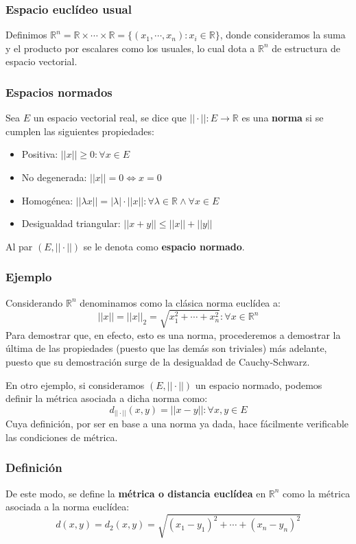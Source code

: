 \documentclass[10pt,a4paper,openright]{book}
\theoremstyle{break}
\begin{document}
\subsubsection*{Espacio euclídeo usual}
Definimos $\mathbb R ^n = \mathbb R\times \cdots \times \mathbb R = \{(x_1, \cdots, x_n): x_i\in \mathbb R\}$, donde consideramos la suma y el producto por escalares como los usuales, lo cual dota a $\mathbb R^n$ de estructura de espacio vectorial.

\subsubsection*{Espacios normados}
Sea $E$ un espacio vectorial real, se dice que $||\cdot||: E \rightarrow \mathbb R$ es una \textbf{norma} si se cumplen las siguientes propiedades:
\begin{itemize}
\item Positiva: $||x||\geq 0: \forall x \in E$
\item No degenerada: $||x|| = 0 \Leftrightarrow x = 0$
\item Homogénea: $||\lambda x|| = |\lambda| \cdot ||x||: \forall \lambda \in \mathbb R \wedge \forall x \in E$
\item Desigualdad triangular: $||x+y||\leq ||x|| + ||y||$
\end{itemize}
Al par $(E,||\cdot||)$ se le denota como \textbf{espacio normado}.

\subsubsection*{Ejemplo}
Considerando $\mathbb R^n$ denominamos como la clásica norma euclídea a:
$$||x|| = ||x||_2 = \sqrt{x_1^2+\cdots + x_n^2} : \forall x \in \mathbb R^n $$
Para demostrar que, en efecto, esto es una norma, procederemos a demostrar la última de las propiedades (puesto que las demás son triviales) más adelante, puesto que su demostración surge de la desigualdad de Cauchy-Schwarz.

En otro ejemplo, si consideramos $\left(E,||\cdot||\right)$ un espacio normado, podemos definir la métrica asociada a dicha norma como:
$$d_{||\cdot||}(x,y)=||x-y||: \forall x, y \in E$$
Cuya definición, por ser en base a una norma ya dada, hace fácilmente verificable las condiciones de métrica.

\subsubsection*{Definición}
De este modo, se define la \textbf{métrica o distancia euclídea} en $\mathbb R^n$ como la métrica asociada a la norma euclídea:
$$d(x,y)=d_2(x,y)=\sqrt{(x_1-y_1)^2+\cdots + (x_n-y_n)^2}$$
\end{document}
